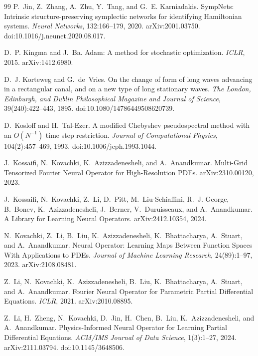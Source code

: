 \documentclass[11pt]{article}
\theoremstyle{definition}
\theoremstyle{remark}
\begin{document}
\begin{thebibliography}{99}
P.~Jin, Z.~Zhang, A.~Zhu, Y.~Tang, and G.~E. Karniadakis.
\newblock SympNets: Intrinsic structure-preserving symplectic networks for
identifying Hamiltonian systems.
\newblock \emph{Neural Networks}, 132:166--179, 2020. arXiv:2001.03750.
doi:10.1016/j.neunet.2020.08.017.

D.~P. Kingma and J.~Ba.
\newblock Adam: A method for stochastic optimization.
\newblock \emph{ICLR}, 2015. arXiv:1412.6980.

D.~J. Korteweg and G.~de~Vries.
\newblock On the change of form of long waves advancing in a rectangular canal,
and on a new type of long stationary waves.
\newblock \emph{The London, Edinburgh, and Dublin Philosophical Magazine and
Journal of Science}, 39(240):422--443, 1895. doi:10.1080/14786449508620739.

D.~Kosloff and H.~Tal-Ezer.
\newblock A modified {C}hebyshev pseudospectral method with an {$O(N^{-1})$} time
step restriction.
\newblock \emph{Journal of Computational Physics}, 104(2):457--469, 1993.
doi:10.1006/jcph.1993.1044.

J.~Kossaifi, N.~Kovachki, K.~Azizzadenesheli, and A.~Anandkumar.
\newblock Multi-Grid Tensorized Fourier Neural Operator for High-Resolution
PDEs.
\newblock arXiv:2310.00120, 2023.

J.~Kossaifi, N.~Kovachki, Z.~Li, D.~Pitt, M.~Liu-Schiaffini, R.~J. George,
B.~Bonev, K.~Azizzadenesheli, J.~Berner, V.~Duruisseaux, and A.~Anandkumar.
\newblock A Library for Learning Neural Operators.
\newblock arXiv:2412.10354, 2024.

N.~Kovachki, Z.~Li, B.~Liu, K.~Azizzadenesheli, K.~Bhattacharya, A.~Stuart, and
A.~Anandkumar.
\newblock Neural Operator: Learning Maps Between Function Spaces With
Applications to PDEs.
\newblock \emph{Journal of Machine Learning Research}, 24(89):1--97, 2023.
arXiv:2108.08481.

Z.~Li, N.~Kovachki, K.~Azizzadenesheli, B.~Liu, K.~Bhattacharya, A.~Stuart, and
A.~Anandkumar.
\newblock Fourier Neural Operator for Parametric Partial Differential Equations.
\newblock \emph{ICLR}, 2021. arXiv:2010.08895.

Z.~Li, H.~Zheng, N.~Kovachki, D.~Jin, H.~Chen, B.~Liu, K.~Azizzadenesheli, and
A.~Anandkumar.
\newblock Physics-Informed Neural Operator for Learning Partial Differential
Equations.
\newblock \emph{ACM/IMS Journal of Data Science}, 1(3):1--27, 2024.
arXiv:2111.03794. doi:10.1145/3648506.


\end{thebibliography}
\end{document}
